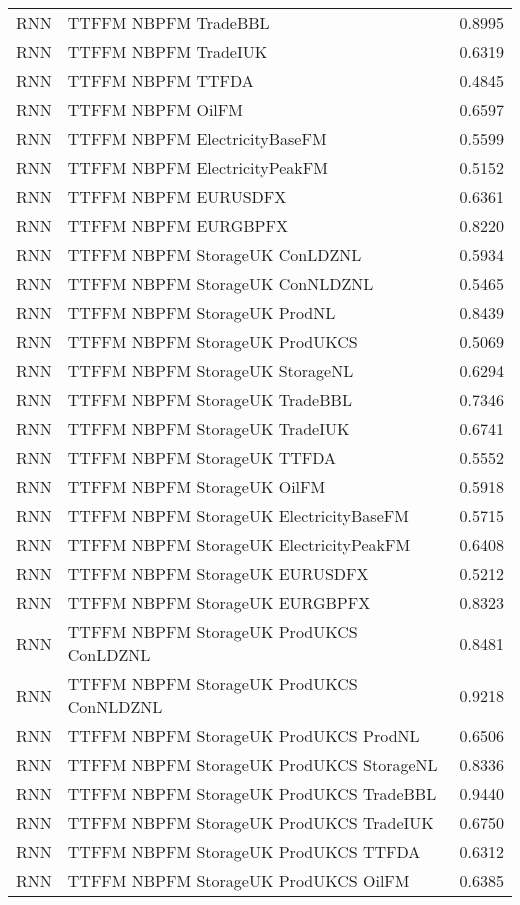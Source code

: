 \begin{table}[h!]
\begin{adjustbox}{max width=\textwidth}
\begin{tabular}{llr}
  RNN & TTFFM NBPFM TradeBBL & 0.8995 \\ 
  RNN & TTFFM NBPFM TradeIUK & 0.6319 \\ 
  RNN & TTFFM NBPFM TTFDA & 0.4845 \\ 
  RNN & TTFFM NBPFM OilFM & 0.6597 \\ 
  RNN & TTFFM NBPFM ElectricityBaseFM & 0.5599 \\ 
  RNN & TTFFM NBPFM ElectricityPeakFM & 0.5152 \\ 
  RNN & TTFFM NBPFM EURUSDFX & 0.6361 \\ 
  RNN & TTFFM NBPFM EURGBPFX & 0.8220 \\ 
  RNN & TTFFM NBPFM StorageUK ConLDZNL & 0.5934 \\ 
  RNN & TTFFM NBPFM StorageUK ConNLDZNL & 0.5465 \\ 
  RNN & TTFFM NBPFM StorageUK ProdNL & 0.8439 \\ 
  RNN & TTFFM NBPFM StorageUK ProdUKCS & 0.5069 \\ 
  RNN & TTFFM NBPFM StorageUK StorageNL & 0.6294 \\ 
  RNN & TTFFM NBPFM StorageUK TradeBBL & 0.7346 \\ 
  RNN & TTFFM NBPFM StorageUK TradeIUK & 0.6741 \\ 
  RNN & TTFFM NBPFM StorageUK TTFDA & 0.5552 \\ 
  RNN & TTFFM NBPFM StorageUK OilFM & 0.5918 \\ 
  RNN & TTFFM NBPFM StorageUK ElectricityBaseFM & 0.5715 \\ 
  RNN & TTFFM NBPFM StorageUK ElectricityPeakFM & 0.6408 \\ 
  RNN & TTFFM NBPFM StorageUK EURUSDFX & 0.5212 \\ 
  RNN & TTFFM NBPFM StorageUK EURGBPFX & 0.8323 \\ 
  RNN & TTFFM NBPFM StorageUK ProdUKCS ConLDZNL & 0.8481 \\ 
  RNN & TTFFM NBPFM StorageUK ProdUKCS ConNLDZNL & 0.9218 \\ 
  RNN & TTFFM NBPFM StorageUK ProdUKCS ProdNL & 0.6506 \\ 
  RNN & TTFFM NBPFM StorageUK ProdUKCS StorageNL & 0.8336 \\ 
  RNN & TTFFM NBPFM StorageUK ProdUKCS TradeBBL & 0.9440 \\ 
  RNN & TTFFM NBPFM StorageUK ProdUKCS TradeIUK & 0.6750 \\ 
  RNN & TTFFM NBPFM StorageUK ProdUKCS TTFDA & 0.6312 \\ 
  RNN & TTFFM NBPFM StorageUK ProdUKCS OilFM & 0.6385 \\ 

\end{tabular}
\end{adjustbox}
\end{table}
